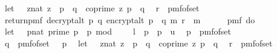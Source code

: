 \begin{isabellebody}
\ \ let\ {\isasymZ}\ {\isacharequal}{\kern0pt}\ {\isacharbraceleft}{\kern0pt}{\isacharparenleft}{\kern0pt}z{\isacharcolon}{\kern0pt}{\isacharcolon}{\kern0pt}nat{\isacharparenright}{\kern0pt}{\isachardot}{\kern0pt}\ z\ {\isacharless}{\kern0pt}\ p\ {\isacharasterisk}{\kern0pt}\ q\ {\isasymand}\ coprime\ z\ {\isacharparenleft}{\kern0pt}p\ {\isacharasterisk}{\kern0pt}\ q{\isacharparenright}{\kern0pt}{\isacharbraceright}{\kern0pt}{\isacharsemicolon}{\kern0pt}\isanewline
\ \ r\ {\isasymleftarrow}\ pmf{\isacharunderscore}{\kern0pt}of{\isacharunderscore}{\kern0pt}set\ {\isasymZ}{\isacharsemicolon}{\kern0pt}\isanewline
\ \ return{\isacharunderscore}{\kern0pt}pmf\ {\isacharparenleft}{\kern0pt}decrypt{\isacharunderscore}{\kern0pt}alt\ p\ q\ {\isacharparenleft}{\kern0pt}encrypt{\isacharunderscore}{\kern0pt}alt\ {\isacharparenleft}{\kern0pt}p\ {\isacharasterisk}{\kern0pt}\ q{\isacharparenright}{\kern0pt}\ m\ r{\isacharparenright}{\kern0pt}\ {\isacharequal}{\kern0pt}\ m{\isacharparenright}{\kern0pt}{\isacharbraceright}{\kern0pt}{\isacharparenright}{\kern0pt}\isanewline
\ \ {\isacharequal}{\kern0pt}\ \isanewline
\ \ pmf\ {\isacharparenleft}{\kern0pt}do\ {\isacharbraceleft}{\kern0pt}\isanewline
\ \ let\ {\isasymK}\ {\isacharequal}{\kern0pt}\ {\isacharbraceleft}{\kern0pt}{\isacharparenleft}{\kern0pt}p{\isacharcolon}{\kern0pt}{\isacharcolon}{\kern0pt}nat{\isacharparenright}{\kern0pt}{\isachardot}{\kern0pt}\ prime\ p\ {\isasymand}\ p\ mod\ {}\ {\isacharequal}{\kern0pt}\ {}\ {\isasymand}\ l\ {\isasymle}\ p\ {\isasymand}\ p\ {\isasymle}\ u{\isacharbraceright}{\kern0pt}{\isacharsemicolon}{\kern0pt}\isanewline
\ \ p\ {\isasymleftarrow}\ pmf{\isacharunderscore}{\kern0pt}of{\isacharunderscore}{\kern0pt}set\ {\isasymK}{\isacharsemicolon}{\kern0pt}\ \isanewline
\ \ q\ {\isasymleftarrow}\ pmf{\isacharunderscore}{\kern0pt}of{\isacharunderscore}{\kern0pt}set\ {\isacharparenleft}{\kern0pt}{\isasymK}\ {\isacharminus}{\kern0pt}\ {\isacharbraceleft}{\kern0pt}p{\isacharbraceright}{\kern0pt}{\isacharparenright}{\kern0pt}{\isacharsemicolon}{\kern0pt}\isanewline
\ \ let\ {\isasymZ}\ {\isacharequal}{\kern0pt}\ {\isacharbraceleft}{\kern0pt}{\isacharparenleft}{\kern0pt}z{\isacharcolon}{\kern0pt}{\isacharcolon}{\kern0pt}nat{\isacharparenright}{\kern0pt}{\isachardot}{\kern0pt}\ z\ {\isacharless}{\kern0pt}\ p\ {\isacharasterisk}{\kern0pt}\ q\ {\isasymand}\ coprime\ z\ {\isacharparenleft}{\kern0pt}p\ {\isacharasterisk}{\kern0pt}\ q{\isacharparenright}{\kern0pt}{\isacharbraceright}{\kern0pt}{\isacharsemicolon}{\kern0pt}\isanewline
\ \ r\ {\isasymleftarrow}\ pmf{\isacharunderscore}{\kern0pt}of{\isacharunderscore}{\kern0pt}set\ {\isasymZ}{\isacharsemicolon}{\kern0pt}\isanewline

\end{isabellebody}
